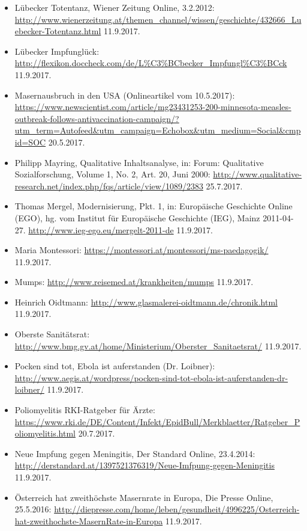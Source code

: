\documentclass[
    a4paper,
    12pt,
    hyphens,
    chapterprefix=true,
    headheight=33pt,
    footheight=29pt,
    headings=optiontohead,
]{scrartcl}
\begin{document}
{\begin{itemize}
\item{Lübecker Totentanz, Wiener Zeitung Online, 3.2.2012: \url{http://www.wienerzeitung.at/themen_channel/wissen/geschichte/432666_Luebecker-Totentanz.html} 11.9.2017.}
\item{Lübecker Impfunglück: \url{http://flexikon.doccheck.com/de/L\%C3\%BCbecker_Impfungl\%C3\%BCck} 11.9.2017.}
\item{Masernausbruch in den USA (Onlineartikel vom 10.5.2017): \url{https://www.newscientist.com/article/mg23431253-200-minnesota-measles-outbreak-follows-antivaccination-campaign/?utm_term=Autofeed&utm_campaign=Echobox&utm_medium=Social&cmpid=SOC} 20.5.2017.}
\item{Philipp Mayring, Qualitative Inhaltsanalyse, in: Forum: Qualitative Sozialforschung, Volume 1, No. 2, Art. 20, Juni 2000: \url{http://www.qualitative-research.net/index.php/fqs/article/view/1089/2383} 25.7.2017.}
\item{Thomas Mergel, Modernisierung, Pkt. 1, in: Europäische Geschichte Online (EGO), hg. vom Institut für Europäische Geschichte (IEG), Mainz 2011-04-27. \url{http://www.ieg-ego.eu/mergelt-2011-de} 11.9.2017.}
\item{Maria Montessori: \url{https://montessori.at/montessori/ms-paedagogik/} \\11.9.2017.}
\item{Mumps: \url{http://www.reisemed.at/krankheiten/mumps} 11.9.2017.}
\item{Heinrich Oidtmann: \url{http://www.glasmalerei-oidtmann.de/chronik.html} \\11.9.2017.}
\item{Oberste Sanitätsrat: \url{http://www.bmg.gv.at/home/Ministerium/Oberster_Sanitaetsrat/} 11.9.2017.}
\item{Pocken sind tot, Ebola ist auferstanden (Dr. Loibner): \url{http://www.aegis.at/wordpress/pocken-sind-tot-ebola-ist-auferstanden-dr-loibner/} 11.9.2017.}
\item{Poliomyelitis RKI-Ratgeber für Ärzte: \url{https://www.rki.de/DE/Content/Infekt/EpidBull/Merkblaetter/Ratgeber_Poliomyelitis.html} 20.7.2017.}
\item{Neue Impfung gegen Meningitis, Der Standard Online, 23.4.2014: \url{http://derstandard.at/1397521376319/Neue-Imfpung-gegen-Meningitis} 11.9.2017.}
\item{Österreich hat zweithöchste Masernrate in Europa, Die Presse Online, 25.5.2016: \url{http://diepresse.com/home/leben/gesundheit/4996225/Osterreich-hat-zweithochste-MasernRate-in-Europa} 11.9.2017.}

\end{itemize}}
\end{document}
